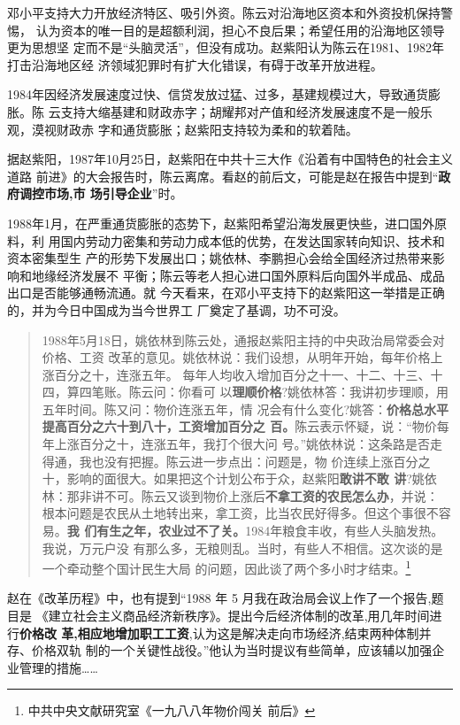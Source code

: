 邓小平支持大力开放经济特区、吸引外资。陈云对沿海地区资本和外资投机保持警惕，
认为资本的唯一目的是超额利润，担心不良后果；希望任用的沿海地区领导更为思想坚
定而不是“头脑灵活”，但没有成功。赵紫阳认为陈云在1981、1982年打击沿海地区经
济领域犯罪时有扩大化错误，有碍于改革开放进程。

1984年因经济发展速度过快、信贷发放过猛、过多，基建规模过大，导致通货膨胀。陈
云支持大缩基建和财政赤字；胡耀邦对产值和经济发展速度不是一般乐观，漠视财政赤
字和通货膨胀；赵紫阳支持较为柔和的软着陆。


据赵紫阳，1987年10月25日，赵紫阳在中共十三大作《沿着有中国特色的社会主义道路
前进》的大会报告时，陈云离席。看赵的前后文，可能是赵在报告中提到“\textbf{政府调控市场,市
  场引导企业}”时。

1988年1月，在严重通货膨胀的态势下，赵紫阳希望沿海发展更快些，进口国外原料，利
用国内劳动力密集和劳动力成本低的优势，在发达国家转向知识、技术和资本密集型生
产的形势下发展出口；姚依林、李鹏担心会给全国经济过热带来影响和地缘经济发展不
平衡；陈云等老人担心进口国外原料后向国外半成品、成品出口是否能够通畅流通。就
今天看来，在邓小平支持下的赵紫阳这一举措是正确的，并为今日中国成为当今世界工
厂奠定了基调，功不可没。

\begin{quotation}
  1988年5月18日，姚依林到陈云处，通报赵紫阳主持的中央政治局常委会对价格、工资
  改革的意见。姚依林说：我们设想，从明年开始，每年价格上涨百分之十，连涨五年。
  每年人均收入增加百分之十一、十二、十三、十四，算四笔账。陈云问：你看可
  以\textbf{理顺价格}?姚依林答：我讲初步理顺，用五年时间。陈又问：物价连涨五年，情
  况会有什么变化?姚答：\textbf{价格总水平提高百分之六十到八十，工资增加百分之
    百。}陈云表示怀疑，说：“物价每年上涨百分之十，连涨五年，我打个很大问
  号。”姚依林说：这条路是否走得通，我也没有把握。陈云进一步点出：问题是，物
  价连续上涨百分之十，影响的面很大。如果把这个计划公布于众，赵紫阳\textbf{敢讲不敢
    讲}?姚依林：那非讲不可。陈云又谈到物价上涨后\textbf{不拿工资的农民怎么办}，并说：
  根本问题是农民从土地转出来，拿工资，比当农民好得多。但这个事很不容易。\textbf{我
    们有生之年，农业过不了关。}1984年粮食丰收，有些人头脑发热。我说，万元户没
  有那么多，无粮则乱。当时，有些人不相信。这次谈的是一个牵动整个国计民生大局
  的问题，因此谈了两个多小时才结束。\footnote{中共中央文献研究室《一九八八年物价闯关
    前后》}
\end{quotation}
赵在《改革历程》中，也有提到“1988 年 5 月我在政治局会议上作了一个报告,题目是
《建立社会主义商品经济新秩序》。提出今后经济体制的改革,用几年时间进行\textbf{价格改
  革,相应地增加职工工资},认为这是解决走向市场经济,结束两种体制并存、价格双轨
制的一个关键性战役。”他认为当时提议有些简单，应该辅以加强企业管理的措施……

